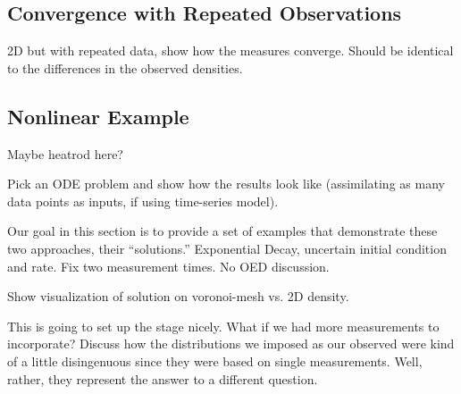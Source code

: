 \subsection{Convergence with Repeated Observations}
2D but with repeated data, show how the measures converge. Should be identical to the differences in the observed densities. 

\subsection{Nonlinear Example}
Maybe heatrod here?


Pick an ODE problem and show how the results look like (assimilating as many data points as inputs, if using time-series model). 

Our goal in this section is to provide a set of examples that demonstrate these two approaches, their ``solutions.''
Exponential Decay, uncertain initial condition and rate. Fix two measurement times. No OED discussion.

Show visualization of solution on voronoi-mesh vs. 2D density. 

This is going to set up the stage nicely.
What if we had more measurements to incorporate? Discuss how the distributions we imposed as our observed were kind of a little disingenuous since they were based on single measurements. Well, rather, they represent the answer to a different question.

